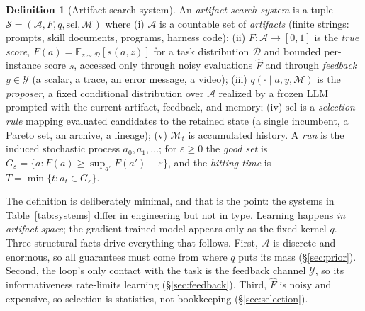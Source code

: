 \documentclass{article}
\theoremstyle{plain}
\theoremstyle{definition}
\newtheorem{definition}[theorem]{Definition}
\theoremstyle{remark}
\newcommand{\A}{\mathcal{A}}
\newcommand{\Y}{\mathcal{Y}}
\newcommand{\D}{\mathcal{D}}
\newcommand{\M}{\mathcal{M}}
\newcommand{\E}{\mathbb{E}}
\newcommand{\sel}{\mathrm{sel}}
\newcommand{\Fhat}{\widehat{F}}
\newcommand{\eps}{\varepsilon}
\begin{document}
\begin{definition}[Artifact-search system]
\label{def:as}
An \emph{artifact-search system} is a tuple $\mathcal{S} = (\A, F, q, \sel, \M)$ where
(i) $\A$ is a countable set of \emph{artifacts} (finite strings: prompts, skill documents, programs, harness code);
(ii) $F : \A \to [0,1]$ is the \emph{true score}, $F(a) = \E_{z \sim \D}[s(a, z)]$ for a task distribution $\D$ and bounded per-instance score $s$, accessed only through noisy evaluations $\Fhat$ and through \emph{feedback} $y \in \Y$ (a scalar, a trace, an error message, a video);
(iii) $q(\cdot \mid a, y, \M)$ is the \emph{proposer}, a fixed conditional distribution over $\A$ realized by a frozen LLM prompted with the current artifact, feedback, and memory;
(iv) $\sel$ is a \emph{selection rule} mapping evaluated candidates to the retained state (a single incumbent, a Pareto set, an archive, a lineage);
(v) $\M_t$ is accumulated history.
A \emph{run} is the induced stochastic process $a_0, a_1, \ldots$; for $\eps \ge 0$ the \emph{good set} is $G_\eps = \{a : F(a) \ge \sup_{a'} F(a') - \eps\}$, and the \emph{hitting time} is $T = \min\{t : a_t \in G_\eps\}$.
\end{definition}

The definition is deliberately minimal, and that is the point: the systems in Table~\ref{tab:systems} differ in engineering but not in type. Learning happens \emph{in artifact space}; the gradient-trained model appears only as the fixed kernel $q$. Three structural facts drive everything that follows. First, $\A$ is discrete and enormous, so all guarantees must come from where $q$ puts its mass (\S\ref{sec:prior}). Second, the loop's only contact with the task is the feedback channel $\Y$, so its informativeness rate-limits learning (\S\ref{sec:feedback}). Third, $\Fhat$ is noisy and expensive, so selection is statistics, not bookkeeping (\S\ref{sec:selection}).
\end{document}
